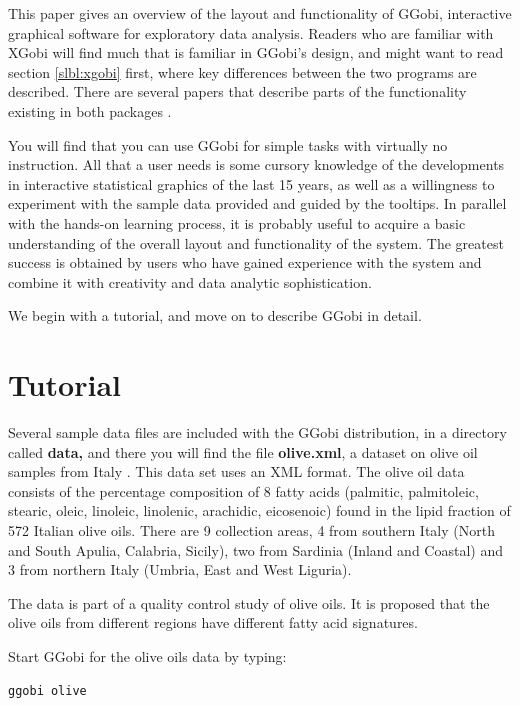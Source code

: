 \documentclass[11pt]{article}
\begin{document}
This paper gives an overview of the layout and functionality of GGobi,
interactive graphical software for exploratory data analysis.  Readers
who are familiar with XGobi will find much that is familiar in GGobi's
design, and might want to read section \ref{slbl:xgobi} first, where
key differences between the two programs are described. There are
several papers that describe parts of the functionality existing in
both packages
\cite{BCS95,SCB97,SB98,BAHM88,CBC93,CBCH95,CB95,BCAH95c}.

You will find that you can use GGobi for simple tasks with virtually
no instruction.  All that a user needs is some cursory knowledge of
the developments in interactive statistical graphics of the last 15
years, as well as a willingness to experiment with the sample data
provided and guided by the tooltips.  In parallel with the hands-on
learning process, it is probably useful to acquire a basic
understanding of the overall layout and functionality of the system.
The greatest success is obtained by users who have gained experience
with the system and combine it with creativity and data analytic
sophistication.

We begin with a tutorial, and move on to describe GGobi in detail.

\section{Tutorial}

Several sample data files are included with the GGobi distribution, in
a directory called {\bf data,} and there you will find the file {\bf
olive.xml}, a dataset on olive oil samples from Italy \cite{FALT83}.
This data set uses an XML format.  The olive oil data consists of the
percentage composition of 8 fatty acids (palmitic, palmitoleic,
stearic, oleic, linoleic, linolenic, arachidic, eicosenoic) found in
the lipid fraction of 572 Italian olive oils. There are 9 collection
areas, 4 from southern Italy (North and South Apulia, Calabria,
Sicily), two from Sardinia (Inland and Coastal) and 3 from northern
Italy (Umbria, East and West Liguria).

The data is part of a quality control study of olive oils. It is proposed
that the olive oils from different regions have different fatty acid
signatures.

Start GGobi for the olive oils data by typing:

\begin{verbatim}
ggobi olive
\end{verbatim}
\end{document}
